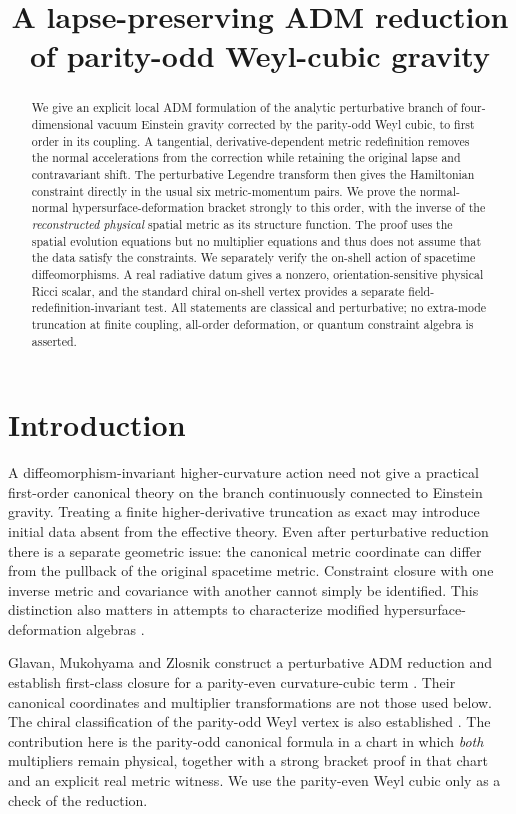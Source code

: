 \documentclass[11pt]{article}
\title{A lapse-preserving ADM reduction of parity-odd Weyl-cubic gravity}
\date{}
\begin{document}
\maketitle
\begin{abstract}
We give an explicit local ADM formulation of the analytic perturbative branch of four-dimensional vacuum Einstein gravity corrected by the parity-odd Weyl cubic, to first order in its coupling. A tangential, derivative-dependent metric redefinition removes the normal accelerations from the correction while retaining the original lapse and contravariant shift. The perturbative Legendre transform then gives the Hamiltonian constraint directly in the usual six metric-momentum pairs. We prove the normal-normal hypersurface-deformation bracket strongly to this order, with the inverse of the \emph{reconstructed physical} spatial metric as its structure function. The proof uses the spatial evolution equations but no multiplier equations and thus does not assume that the data satisfy the constraints. We separately verify the on-shell action of spacetime diffeomorphisms. A real radiative datum gives a nonzero, orientation-sensitive physical Ricci scalar, and the standard chiral on-shell vertex provides a separate field-redefinition-invariant test. All statements are classical and perturbative; no extra-mode truncation at finite coupling, all-order deformation, or quantum constraint algebra is asserted.
\end{abstract}

\section{Introduction}
A diffeomorphism-invariant higher-curvature action need not give a practical first-order canonical theory on the branch continuously connected to Einstein gravity. Treating a finite higher-derivative truncation as exact may introduce initial data absent from the effective theory. Even after perturbative reduction there is a separate geometric issue: the canonical metric coordinate can differ from the pullback of the original spacetime metric. Constraint closure with one inverse metric and covariance with another cannot simply be identified. This distinction also matters in attempts to characterize modified hypersurface-deformation algebras \cite{BDS,BDD}.

Glavan, Mukohyama and Zlosnik construct a perturbative ADM reduction and establish first-class closure for a parity-even curvature-cubic term \cite[Secs.~2--5]{GMZ}. Their canonical coordinates and multiplier transformations are not those used below. The chiral classification of the parity-odd Weyl vertex is also established \cite{MP}. The contribution here is the parity-odd canonical formula in a chart in which \emph{both} multipliers remain physical, together with a strong bracket proof in that chart and an explicit real metric witness. We use the parity-even Weyl cubic only as a check of the reduction.
\end{document}
